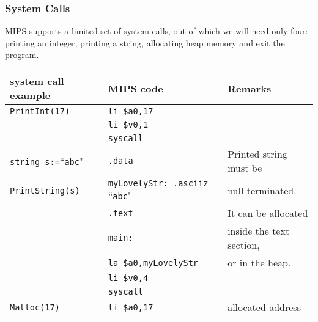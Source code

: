 \documentclass{article}
\begin{document}
\subsubsection{System Calls}
\label{subsection_System_Calls}
MIPS supports a limited set of system calls,
out of which we will need only four:
printing an integer,
printing a string,
allocating heap memory and
exit the program.

\begin{table}[h]
\centering
\begin{tabular}{|l|l|l|}
\hline
system call example & MIPS code & Remarks      \\
\hline
\verb"PrintInt(17)" & \verb"li $a0,17" & \\
                    & \verb"li $v0,1"  & \\
                    & \verb"syscall"   & \\
\hline
\verb"string s:="``\verb"abc"" & \verb".data"                              & Printed string must be   \\
\verb"PrintString(s)"          & \verb"myLovelyStr: .asciiz "``\verb"abc"" & null terminated.         \\
                               & \verb".text"                              & It can be allocated      \\
                               & \verb"main:"                              & inside the text section, \\
                               & \verb"la $a0,myLovelyStr"                 & or in the heap.          \\
                               & \verb"li $v0,4"                           &                          \\
                               & \verb"syscall"                            &                          \\
\hline
\verb"Malloc(17)" & \verb"li $a0,17" & allocated address         \\

\end{tabular}
\end{table}
\end{document}
